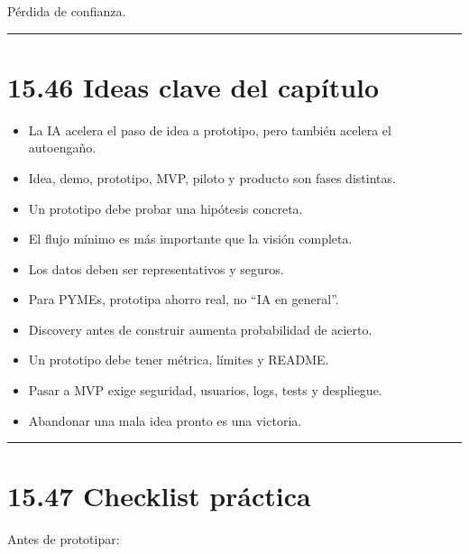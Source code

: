 Pérdida de confianza.

\begin{center}\rule{0.5\linewidth}{0.5pt}\end{center}

\section{15.46 Ideas clave del
capítulo}\label{ideas-clave-del-capuxedtulo-14}

\begin{itemize}
\tightlist
\item
  La IA acelera el paso de idea a prototipo, pero también acelera el
  autoengaño.
\item
  Idea, demo, prototipo, MVP, piloto y producto son fases distintas.
\item
  Un prototipo debe probar una hipótesis concreta.
\item
  El flujo mínimo es más importante que la visión completa.
\item
  Los datos deben ser representativos y seguros.
\item
  Para PYMEs, prototipa ahorro real, no ``IA en general''.
\item
  Discovery antes de construir aumenta probabilidad de acierto.
\item
  Un prototipo debe tener métrica, límites y README.
\item
  Pasar a MVP exige seguridad, usuarios, logs, tests y despliegue.
\item
  Abandonar una mala idea pronto es una victoria.
\end{itemize}

\begin{center}\rule{0.5\linewidth}{0.5pt}\end{center}

\section{15.47 Checklist práctica}\label{checklist-pruxe1ctica-14}

Antes de prototipar:

